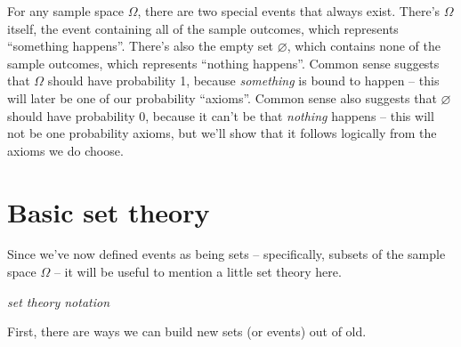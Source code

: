 \documentclass[
  a4paper,
]{book}
\theoremstyle{definition}
\theoremstyle{definition}
\theoremstyle{definition}
\theoremstyle{remark}
\begin{document}
For any sample space \(\Omega\), there are two special events that always exist. There's \(\Omega\) itself, the event containing all of the sample outcomes, which represents ``something happens''. There's also the empty set \(\varnothing\), which contains none of the sample outcomes, which represents ``nothing happens''. Common sense suggests that \(\Omega\) should have probability 1, because \emph{something} is bound to happen -- this will later be one of our probability ``axioms''. Common sense also suggests that \(\varnothing\) should have probability 0, because it can't be that \emph{nothing} happens -- this will not be one probability axioms, but we'll show that it follows logically from the axioms we do choose.

\hypertarget{set-theory}{%
\section{Basic set theory}\label{set-theory}}

Since we've now defined events as being sets -- specifically, subsets of the sample space \(\Omega\) -- it will be useful to mention a little set theory here.

\emph{set theory notation}

First, there are ways we can build new sets (or events) out of old.
\end{document}
